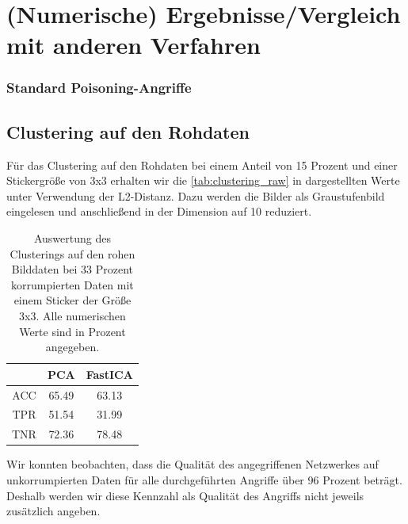 \documentclass[11pt,a4paper]{article}
\numberwithin{equation}{section}
\begin{document}
	\section{(Numerische) Ergebnisse/Vergleich mit anderen Verfahren} \label{chapter_comparisons}
	
	\subsubsection{Standard Poisoning-Angriffe}
	
	\subsection{Clustering auf den Rohdaten}
	Für das Clustering auf den Rohdaten bei einem Anteil von 15 Prozent und einer Stickergröße von 3x3 erhalten wir die \autoref{tab:clustering_raw} in dargestellten Werte unter Verwendung der L2-Distanz. Dazu werden die Bilder als Graustufenbild eingelesen und anschließend in der Dimension auf 10 reduziert.
	\begin{table}[ht]
		\begin{center}
				\begin{tabular}{c|c|c}
					& PCA & FastICA \\ \hline
					ACC	 & 	65.49 & 63.13 \\
					TPR		& 51.54 & 31.99 \\
					TNR	& 72.36 	&78.48 	 
				\end{tabular}
				\caption[Auswertung des Clusterings auf den rohen Bilddaten]{Auswertung des Clusterings auf den rohen Bilddaten bei 33 Prozent korrumpierten Daten mit einem Sticker der Größe 3x3. Alle numerischen Werte sind in Prozent angegeben.}	
				\label{tab:clustering_raw}
			
			
		\end{center}
	\end{table}
	
	
	Wir konnten beobachten, dass die Qualität des angegriffenen Netzwerkes auf unkorrumpierten Daten für alle durchgeführten Angriffe über 96 Prozent beträgt. Deshalb werden wir diese Kennzahl als Qualität des Angriffs nicht jeweils zusätzlich angeben.
	
\end{document}
